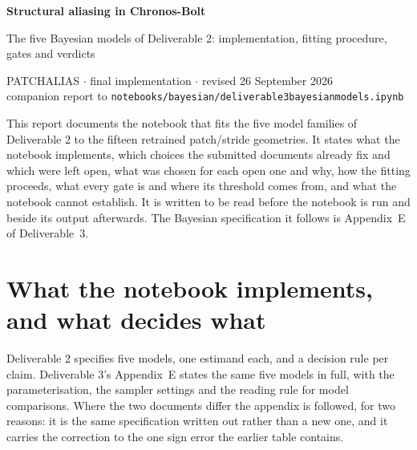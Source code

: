\documentclass[10pt,a4paper]{article}
\newcommand{\code}[1]{\texttt{\UseBreakableUnderscores #1}}
\newcommand{\UseBreakableUnderscores}{\def\_{\textunderscore\allowbreak}}
\begin{document}
{\LARGE\bfseries Structural aliasing in Chronos-Bolt}\par\vspace{4pt}
{\large The five Bayesian models of Deliverable 2: implementation, fitting procedure, gates and verdicts}\par\vspace{4pt}
{\small PATCHALIAS $\cdot$ final implementation $\cdot$ revised 26 September 2026\\ companion report to \code{notebooks/bayesian/deliverable3\_bayesian\_models.ipynb}}

\medskip
This report documents the notebook that fits the five model families of Deliverable 2 to the fifteen retrained patch/stride geometries. It states what the notebook implements, which choices the submitted documents already fix and which were left open, what was chosen for each open one and why, how the fitting proceeds, what every gate is and where its threshold comes from, and what the notebook cannot establish. It is written to be read before the notebook is run and beside its output afterwards. The Bayesian specification it follows is Appendix~E of Deliverable~3.

\section{What the notebook implements, and what decides what}
Deliverable 2 specifies five models, one estimand each, and a decision rule per claim. Deliverable 3's Appendix~E states the same five models in full, with the parameterisation, the sampler settings and the reading rule for model comparisons. Where the two documents differ the appendix is followed, for two reasons: it is the same specification written out rather than a new one, and it carries the correction to the one sign error the earlier table contains.
\end{document}
